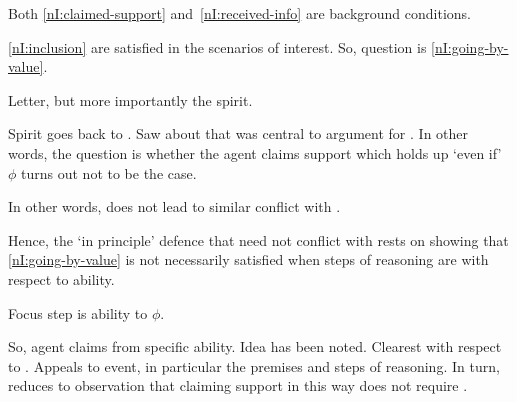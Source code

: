 \begin{note}
  Both \ref{nI:claimed-support} and~\ref{nI:received-info} are background conditions.



  \ref{nI:inclusion} are satisfied in the scenarios of interest.
  So, question is \ref{nI:going-by-value}.

  Letter, but more importantly the spirit.

  Spirit goes back to \eiS{}.
  Saw about that \eiS{} was central to argument for \nI{}.
  In other words, the question is whether the agent claims support which holds up `even if' \(\phi\) turns out not to be the case.

  In other words, \ur{} does not lead to similar conflict with \eiS{}.

  Hence, the `in principle' defence that \ur{} need not conflict with \nI{} rests on showing that \ref{nI:going-by-value} is not necessarily satisfied when steps of reasoning are \ur{} with respect to ability.

  Focus step is ability to \(\phi\).

  So, agent claims from specific ability.
  Idea has been noted.
  Clearest with respect to \WR{}.
  Appeals to event, in particular the premises and steps of reasoning.
  In turn, reduces to observation that claiming support in this way does not require \RBV{}.
\end{note}

